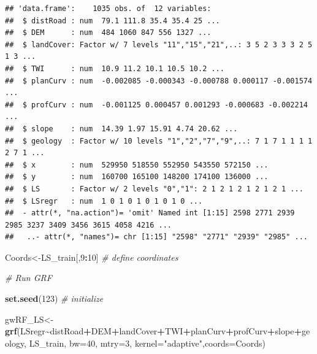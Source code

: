 \documentclass[
]{article}
\newenvironment{Shaded}{\begin{snugshade}}{\end{snugshade}}
\newcommand{\AttributeTok}[1]{\textcolor[rgb]{0.13,0.29,0.53}{#1}}
\newcommand{\CommentTok}[1]{\textcolor[rgb]{0.56,0.35,0.01}{\textit{#1}}}
\newcommand{\DecValTok}[1]{\textcolor[rgb]{0.00,0.00,0.81}{#1}}
\newcommand{\FunctionTok}[1]{\textcolor[rgb]{0.13,0.29,0.53}{\textbf{#1}}}
\newcommand{\NormalTok}[1]{#1}
\newcommand{\OtherTok}[1]{\textcolor[rgb]{0.56,0.35,0.01}{#1}}
\newcommand{\SpecialCharTok}[1]{\textcolor[rgb]{0.81,0.36,0.00}{\textbf{#1}}}
\newcommand{\StringTok}[1]{\textcolor[rgb]{0.31,0.60,0.02}{#1}}
\begin{document}
\begin{verbatim}
## 'data.frame':    1035 obs. of  12 variables:
##  $ distRoad : num  79.1 111.8 35.4 35.4 25 ...
##  $ DEM      : num  484 1060 847 556 1327 ...
##  $ landCover: Factor w/ 7 levels "11","15","21",..: 3 5 2 3 3 3 2 5 1 3 ...
##  $ TWI      : num  10.9 11.2 10.1 10.5 10.2 ...
##  $ planCurv : num  -0.002085 -0.000343 -0.000788 0.000117 -0.001574 ...
##  $ profCurv : num  -0.001125 0.000457 0.001293 -0.000683 -0.002214 ...
##  $ slope    : num  14.39 1.97 15.91 4.74 20.62 ...
##  $ geology  : Factor w/ 10 levels "1","2","7","9",..: 7 1 7 1 1 1 1 2 7 1 ...
##  $ x        : num  529950 518550 552950 543550 572150 ...
##  $ y        : num  160700 165100 148200 174100 136000 ...
##  $ LS       : Factor w/ 2 levels "0","1": 2 1 2 1 2 1 2 1 2 1 ...
##  $ LSregr   : num  1 0 1 0 1 0 1 0 1 0 ...
##  - attr(*, "na.action")= 'omit' Named int [1:15] 2598 2771 2939 2985 3237 3409 3456 3615 4058 4216 ...
##   ..- attr(*, "names")= chr [1:15] "2598" "2771" "2939" "2985" ...
\end{verbatim}

\begin{Shaded}
\begin{Highlighting}[]
\NormalTok{Coords}\OtherTok{\textless{}{-}}\NormalTok{LS\_train[,}\DecValTok{9}\SpecialCharTok{:}\DecValTok{10}\NormalTok{] }\CommentTok{\# define coordinates}

\CommentTok{\# Run GRF}

\FunctionTok{set.seed}\NormalTok{(}\DecValTok{123}\NormalTok{) }\CommentTok{\# initialize }

\NormalTok{gwRF\_LS}\OtherTok{\textless{}{-}}\FunctionTok{grf}\NormalTok{(LSregr}\SpecialCharTok{\textasciitilde{}}\NormalTok{distRoad}\SpecialCharTok{+}\NormalTok{DEM}\SpecialCharTok{+}\NormalTok{landCover}\SpecialCharTok{+}\NormalTok{TWI}\SpecialCharTok{+}\NormalTok{planCurv}\SpecialCharTok{+}\NormalTok{profCurv}\SpecialCharTok{+}\NormalTok{slope}\SpecialCharTok{+}\NormalTok{geology,  LS\_train, }\AttributeTok{bw=}\DecValTok{40}\NormalTok{, }\AttributeTok{mtry=}\DecValTok{3}\NormalTok{, }\AttributeTok{kernel=}\StringTok{"adaptive"}\NormalTok{,}\AttributeTok{coords=}\NormalTok{Coords)}
\end{Highlighting}
\end{Shaded}
\end{document}
